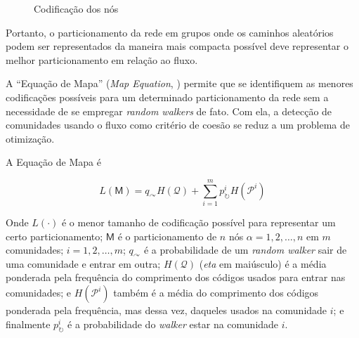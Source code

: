 \documentclass[
  article,
  11pt,
  a4paper,
  english,
  brazil,
  sumario=tradicional]{abntex2}
\begin{document}
\begin{figure}[ht]
  \centering
  \caption{Codificação dos nós}
\end{figure}

Portanto, o particionamento da rede em grupos onde os caminhos aleatórios podem ser representados da maneira mais compacta possível deve representar o melhor particionamento em relação ao fluxo.

A \enquote{Equação de Mapa} (\textit{Map Equation}, \cite{Rosvall2009-sd}) permite que se identifiquem as menores codificações possíveis para um determinado particionamento da rede sem a necessidade de se empregar \textit{random walkers} de fato. Com ela, a detecção de comunidades usando o fluxo como critério de coesão se reduz a um problema de otimização.

A Equação de Mapa é

\begin{equation*}
  L(\mathsf{M}) = q_\curvearrowright H(\mathcal{Q}) + \sum_{i=1}^{m}p^i_\circlearrowright H(\mathcal{P}^i)
\end{equation*}

Onde $L(\cdot)$ é o menor tamanho de codificação possível para representar um certo particionamento; $\mathsf{M}$ é o particionamento de $n$ nós $\alpha = 1, 2, \ldots, n$ em $m$ comunidades; $i = 1, 2, \ldots, m$; $q_\curvearrowright$ é a probabilidade de um \textit{random walker} sair de uma comunidade e entrar em outra; $H(\mathcal{Q})$ (\textit{eta} em maiúsculo) é a média ponderada pela frequência do comprimento dos códigos usados para entrar nas comunidades; e $H(\mathcal{P}^i)$ também é a média do comprimento dos códigos ponderada pela frequência, mas dessa vez, daqueles usados na comunidade $i$; e finalmente $p^i_\circlearrowright$ é a probabilidade do \textit{walker} estar na comunidade $i$.
\end{document}

